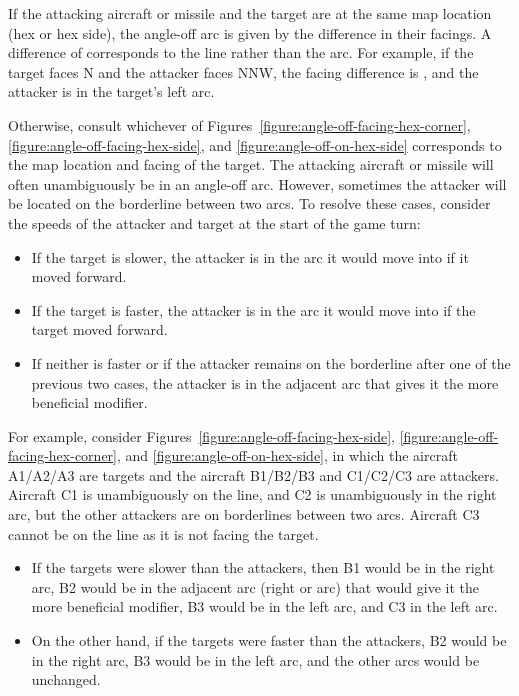 {If the attacking aircraft or missile and the target are at the same map location (hex or hex side), the angle-off arc is given by the difference in their facings. A difference of  corresponds to the  line rather than the  arc. For example, if the target faces N and the attacker faces NNW, the facing difference is , and the attacker is in the target's left  arc.

Otherwise, consult whichever of Figures~\ref{figure:angle-off-facing-hex-corner}, \ref{figure:angle-off-facing-hex-side}, and \ref{figure:angle-off-on-hex-side} corresponds to the map location and facing of the target. The attacking aircraft or missile will often unambiguously be in an angle-off arc. However, sometimes the attacker will be located on the borderline between two arcs. To resolve these cases, consider the speeds of the attacker and target at the start of the game turn:
\begin{itemize}
\item If the target is slower, the attacker is in the arc it would move into if it moved forward.
\item If the target is faster, the attacker is in the arc it would move into if the target moved forward.
\item If neither is faster or if the attacker remains on the borderline after one of the previous two cases, the attacker is in the adjacent arc that gives it the more beneficial modifier.
\end{itemize}

For example, consider Figures~\ref{figure:angle-off-facing-hex-side}, \ref{figure:angle-off-facing-hex-corner}, and \ref{figure:angle-off-on-hex-side}, in which the aircraft A1/A2/A3 are targets and the aircraft B1/B2/B3 and C1/C2/C3 are attackers. Aircraft C1 is unambiguously on the  line, and C2 is unambiguously in the right  arc, but the other attackers are on borderlines between two arcs. Aircraft C3 cannot be on the  line as it is not facing the target.

\begin{itemize}

\item
If the targets were slower than the attackers, then B1 would be in the right  arc, B2 would be in the adjacent arc (right  or  arc) that would give it the more beneficial modifier, B3 would be in the left  arc, and C3 in the left  arc. 

\item
On the other hand, if the targets were faster than the attackers, B2 would be in the right  arc, B3 would be in the left  arc, and the other arcs would be unchanged. 


\end{itemize}}
